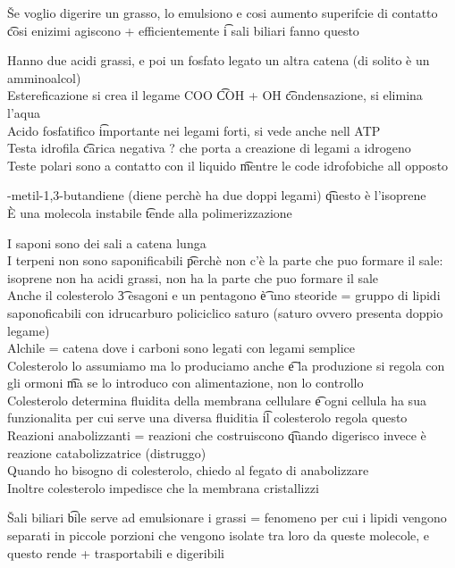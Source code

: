 \documentclass[12pt]{article}
\begin{document}
\v

Se voglio digerire un grasso, lo emulsiono e cosi aumento superifcie di contatto \t cosi enizimi agiscono + efficientemente \t i sali biliari fanno questo

\s[Fosfogliceridi]
Hanno due acidi grassi, e poi un fosfato legato un altra catena (di solito è un amminoalcol) \\
Estereficazione si crea il legame COO \t COH + OH \t condensazione, si elimina l'aqua \\
Acido fosfatifico \t importante nei legami forti, si vede anche nell ATP \\
Testa idrofila \t carica negativa ? che porta a creazione di legami a idrogeno \\
Teste polari sono a contatto con il liquido \t mentre le code idrofobiche all opposto

-metil-1,3-butandiene (diene perchè ha due doppi legami) \t questo è l'isoprene \\
È una molecola instabile \t tende alla polimerizzazione

\s[Colesterolo]
I saponi sono dei sali a catena lunga \\
I terpeni non sono saponificabili \t perchè non c'è la parte che puo formare il sale: isoprene non ha acidi grassi, non ha la parte che puo formare il sale \\
Anche il colesterolo \t 3 esagoni e un pentagono \t è uno steoride = gruppo di lipidi saponoficabili con idrucarburo policiclico saturo (saturo ovvero presenta doppio legame) \\
Alchile = catena dove i carboni sono legati con legami semplice \\
Colesterolo lo assumiamo ma lo produciamo anche \t e la produzione si regola con gli ormoni \t ma se lo introduco con alimentazione, non lo controllo \\
Colesterolo determina fluidita della membrana cellulare \t e ogni cellula ha sua funzionalita per cui serve una diversa fluiditia \t il colesterolo regola questo \\
Reazioni anabolizzanti = reazioni che costruiscono \t quando digerisco invece è reazione catabolizzatrice (distruggo) \\
Quando ho bisogno di colesterolo, chiedo al fegato di anabolizzare \\
Inoltre colesterolo impedisce che la membrana cristallizzi

\v

Sali biliari \t bile serve ad emulsionare i grassi = fenomeno per cui i lipidi vengono separati in piccole porzioni che vengono isolate tra loro da queste molecole, e questo rende + trasportabili e digeribili
\end{document}
